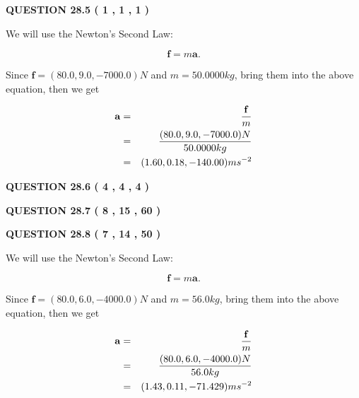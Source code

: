 \documentclass[12pt]{article}
\begin{document}
 
 
  
\vspace{0.2in}
  
{\textbf{\Large{QUESTION
28.5 
 (           1 ,           1 ,           1 )
}}}
  
  


 
 

We will use the Newton's Second Law:
 
\[
\mathbf{f}=m\mathbf{a}.
\]
 
Since $\mathbf{f}= %
(80.0 , 9.0 , -7000.0) N$
and $m= %
50.0000kg$, bring them into the above equation, then we get
 
\begin{eqnarray*}
\mathbf{a}&=&\frac{\mathbf{f}}m  \\
&=&\frac{ %
(80.0 , 9.0 , -7000.0) N}{ %
50.0000kg}  \\
&=& %
(1.60 , 0.18 , -140.00) ms^{-2}
\end{eqnarray*}
 
 
 
  
\vspace{0.2in}
  
{\textbf{\Large{QUESTION
28.6 
 (           4 ,           4 ,           4 )
}}}
  
  
  
\vspace{0.2in}
  
{\textbf{\Large{QUESTION
28.7 
 (           8 ,          15 ,          60 )
}}}
  
  
 
 

 
 
  
\vspace{0.2in}
  
{\textbf{\Large{QUESTION
28.8 
 (           7 ,          14 ,          50 )
}}}
  
  
 
 

We will use the Newton's Second Law:
 
\[
\mathbf{f}=m\mathbf{a}.
\]
 
Since $\mathbf{f}= %
(80.0 , 6.0 , -4000.0) N$
and $m= %
56.0kg$, bring them into the above equation, then we get
 
\begin{eqnarray*}
\mathbf{a}&=&\frac{\mathbf{f}}m  \\
&=&\frac{ %
(80.0 , 6.0 , -4000.0) N}{ %
56.0kg}  \\
&=& %
(1.43 , 0.11 , -71.429) ms^{-2}
\end{eqnarray*}
 
\end{document}
